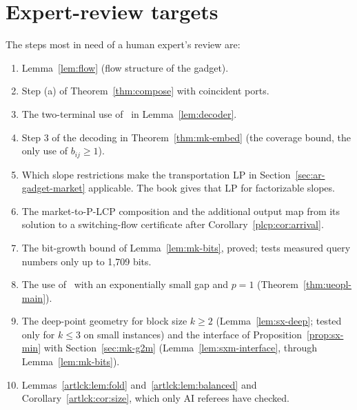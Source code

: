 \section{Expert-review targets}

The steps most in need of a human expert's review are:
\begin{enumerate}[nosep]
\item Lemma~\ref{lem:flow} (flow structure of the gadget).
\item Step (a) of Theorem~\ref{thm:compose} with coincident ports.
\item The two-terminal use of~\cite[Lemma~1]{dgkmw17} in Lemma~\ref{lem:decoder}.
\item Step 3 of the decoding in Theorem~\ref{thm:mk-embed} (the coverage bound, the only use of
$b_{ij}\ge1$).
\item Which slope restrictions make the transportation LP in
Section~\ref{sec:ar-gadget-market} applicable. The book gives that LP
for factorizable slopes.
\item The market-to-P-LCP composition and the additional output map
from its solution to a switching-flow certificate after
Corollary~\ref{plcp:cor:arrival}.
\item The bit-growth bound of Lemma~\ref{lem:mk-bits}, proved; tests measured query numbers only up to 1{,}709 bits.
\item The use of~\cite[Theorem~34]{fgms18} with an exponentially small gap and $p=1$
(Theorem~\ref{thm:ueopl-main}).
\item The deep-point geometry for block size $k\ge2$ (Lemma~\ref{lem:sx-deep}; tested only for $k\le3$ on small instances) and the interface of
Proposition~\ref{prop:sx-min} with Section~\ref{sec:mk-g2m} (Lemma~\ref{lem:sxm-interface}, through
Lemma~\ref{lem:mk-bits}).
\item Lemmas~\ref{artlck:lem:fold} and~\ref{artlck:lem:balanced} and Corollary~\ref{artlck:cor:size},
which only AI referees have checked.
\end{enumerate}
